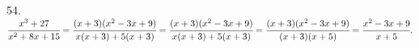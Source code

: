 54. $\cfrac{x^3+27}{x^2+8x+15}=\cfrac{(x+3)(x^2-3x+9)}{x(x+3)+5(x+3)}=\cfrac{(x+3)(x^2-3x+9)}{x(x+3)+5(x+3)}=\cfrac{(x+3)(x^2-3x+9)}{(x+3)(x+5)}=\cfrac{x^2-3x+9}{x+5}.$\\
